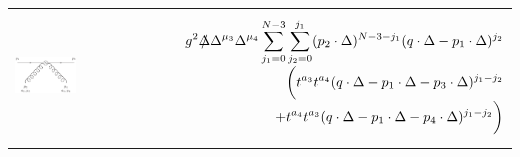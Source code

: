 \documentclass[12pt]{article}
\def\Slash#1{\rlap{\hbox{$\mskip 3 mu /$}}#1}      %
\begin{document}
\begin{tabular}[h]{ll}
%
\hspace*{-10mm}
\begin{minipage}{3cm}
\vspace*{-5mm}
\begin{flushleft}
  \includegraphics[width=2.25\textwidth, angle=0]{OMEqqgg}
\end{flushleft}
\end{minipage}
&
\begin{minipage}{13.0cm}
  \begin{eqnarray}
    \hspace*{20mm}
    \label{eq:omeqqgg}
    &&
    g^2 
    \Slash{\Delta} \Delta^{\mu_3} \Delta^{\mu_4} 
    \sum\limits_{j_1=0}^{N-3}
    \sum\limits_{j_2=0}^{j_1}
    (p_2\cdot \Delta)^{N-3-j_1} (q\cdot \Delta-p_1\cdot \Delta)^{j_2} 
    \nonumber
    \\[-1mm]
    &&
    \biggl(
    t^{a_3} t^{a_4} (q\cdot \Delta-p_1\cdot \Delta-p_3\cdot \Delta)^{j_1-j_2}
    \nonumber
    \\[-1mm]
    &&
    +t^{a_4} t^{a_3} (q\cdot \Delta-p_1\cdot \Delta-p_4\cdot \Delta)^{j_1-j_2}
    \biggr)
\end{eqnarray}
\end{minipage}
%  
\end{tabular}
\vspace{3mm}
\end{document}

